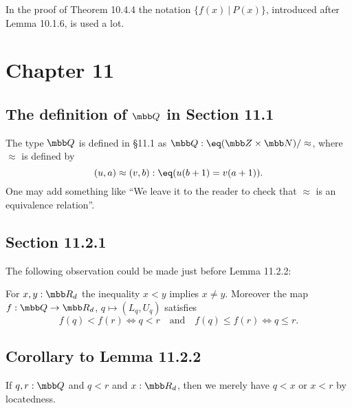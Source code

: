 \documentclass[12pt]{article}
\begin{document}
In the proof of Theorem 10.4.4 the notation $\{f(x)\ \vert\ P(x)\}$, introduced after Lemma 10.1.6, is used a lot.


\section{Chapter 11}

\subsection[The definition of Q in Section 11.1]{The definition of $\mbb Q$ in Section 11.1}

The type $\mbb Q$ is defined in \S11.1 as $\mbb Q:\eq(\mbb Z\times\mbb N)/\approx$, where $\approx$ is defined by 
$$
(u,a)\approx(v,b):\eq(u(b+1)=v(a+1)).
$$ 
One may add something like ``We leave it to the reader to check that $\approx$ is an equivalence relation''.


\subsection{Section 11.2.1}

The following observation could be made just before Lemma 11.2.2: 

For $x,y:\mbb R_d$ the inequality $x<y$ implies $x\neq y$. Moreover the map $f:\mbb Q\to\mbb R_d$, $q\mapsto(L_q,U_q)$ satisfies
$$
f(q)<f(r)\iff q<r\quad\text{and}\quad f(q)\le f(r)\iff q\le r.
$$ 





\subsection{Corollary to Lemma 11.2.2}\label{1122}

If $q,r:\mbb Q$ and $q<r$ and $x:\mbb R_d$, then we merely have $q<x$ or $x<r$ by locatedness.
\end{document}
